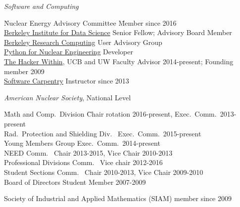 \vspace*{-.5em}
\textit{Software and Computing}
\begin{tabbing}
\hspace*{2 em}\= Nuclear Energy Advisory Committee \hspace*{3em} \= Member since 2016\\
%
\>\href{http://bids.berkeley.edu/}{Berkeley Institute for Data Science} \> Senior Fellow; Advisory Board Member\\
%
\>\href{http://research-it.berkeley.edu/programs/berkeley-research-computing}{Berkeley Research Computing} \> User Advisory Group\\
%
\> \href{http://pyne.io/}{Python for Nuclear Engineering}  \> Developer \\
%
\> \href{http://thehackerwithin.github.io/berkeley/}{The Hacker Within}, UCB and UW  \> Faculty Advisor 2014-present; Founding member 2009\\
%
\> \href{http://software-carpentry.org/}{Software Carpentry}  \> Instructor since 2013%
%
\end{tabbing}
%
\textit{American Nuclear Society}, National Level
\begin{tabbing}
\hspace*{2 em}\= Math and Comp.\ Division \hspace*{6em} \= Chair rotation 2016-present, Exec.\ Comm.\ 2013-present \\
%
\> Rad.\ Protection and Shielding Div.\ \> Exec.\ Comm.\ 2015-present\\
%
\> Young Members Group \> Exec.\ Comm.\ 2014-present\\
%
\> NEED Comm.\ \> Chair 2013-2015, Vice Chair 2010-2013\\
%
\> Professional Divisions Comm.\ \>	Vice chair 2012-2016 \\
%
\> Student Sections Comm.\ \> Chair 2010-2013, Vice Chair 2009-2010\\
%
%
\> Board of Directors \>	Student Member 2007-2009
%
\end{tabbing}

Society of Industrial and Applied Mathematics (SIAM) member since 2009 

